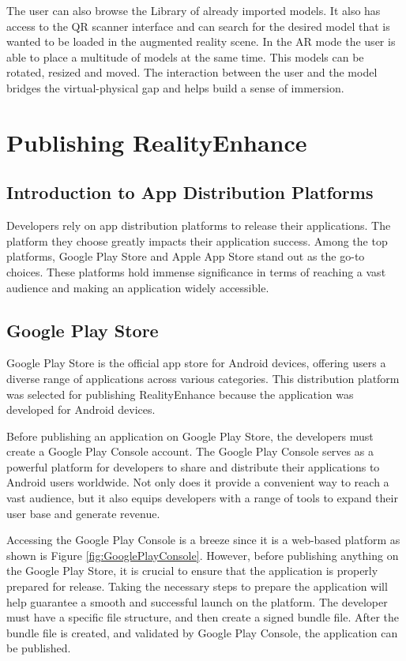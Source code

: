 The user can also browse the Library of already imported models. It also has access to the QR scanner interface and can search for the desired model that is wanted to be loaded in the augmented reality scene. In the \ac{AR} mode the user is able to place a multitude of models at the same time. This models can be rotated, resized and moved. The interaction between the user and the model bridges the virtual-physical gap and helps build a sense of immersion.

\newpage
\section{Publishing RealityEnhance}
\subsection*{Introduction to App Distribution Platforms}
Developers rely on app distribution platforms to release their applications. The platform they choose greatly impacts their application success. Among the top platforms, Google Play Store and Apple App Store stand out as the go-to choices. These platforms hold immense significance in terms of reaching a vast audience and making an application widely accessible.

\subsection*{Google Play Store}
Google Play Store is the official app store for Android devices\cite{GooglePlay}, offering users a diverse range of applications across various categories. This distribution platform was selected for publishing RealityEnhance because the application was developed for Android devices.

Before publishing an application on Google Play Store, the developers must create a Google Play Console account. The Google Play Console serves as a powerful platform for developers to share and distribute their applications to Android users worldwide. Not only does it provide a convenient way to reach a vast audience, but it also equips developers with a range of tools to expand their user base and generate revenue.

Accessing the Google Play Console is a breeze since it is a web-based platform as shown is Figure \ref*{fig:GooglePlayConsole}. However, before publishing anything on the Google Play Store, it is crucial to ensure that the application is properly prepared for release. Taking the necessary steps to prepare the application will help guarantee a smooth and successful launch on the platform. The developer must have a specific file structure, and then create a signed bundle file. After the bundle file is created, and validated by Google Play Console, the application can be published.

